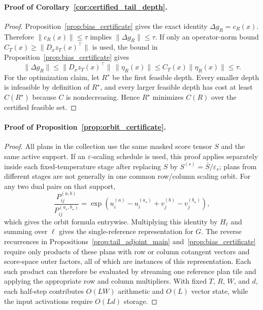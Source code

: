 \paragraph{Proof of Corollary~\ref{cor:certified_tail_depth}.}
\begin{proof}
Proposition~\ref{prop:bias_certificate} gives the exact identity $\Delta g_R=c_R(x)$. Therefore $\|c_R(x)\|\le\tau$ implies $\|\Delta g_R\|\le\tau$. If only an operator-norm bound $C_T(x)\ge\|D_xz_T(x)^\top\|$ is used, the bound in Proposition~\ref{prop:bias_certificate} gives
\[
\|\Delta g_R\|\le \|D_xz_T(x)^\top\|\,\|\eta_R(x)\|\le C_T(x)\|\eta_R(x)\|\le\tau.
\]
For the optimization claim, let $R^\star$ be the first feasible depth. Every smaller depth is infeasible by definition of $R^\star$, and every larger feasible depth has cost at least $C(R^\star)$ because $C$ is nondecreasing. Hence $R^\star$ minimizes $C(R)$ over the certified feasible set.
\end{proof}

\paragraph{Proof of Proposition~\ref{prop:orbit_certificate}.}
\begin{proof}
All plans in the collection use the same masked score tensor $S$ and the same active support. If an $\varepsilon$-scaling schedule is used, this proof applies separately inside each fixed-temperature stage after replacing $S$ by $S^{(s)}=\bar S/\varepsilon_s$; plans from different stages are not generally in one common row/column scaling orbit. For any two dual pairs on that support,
\[
\frac{P_{ij}^{(a,b)}}{P_{ij}^{(a_\star,b_\star)}}
=
\exp(u_i^{(a)}-u_i^{(a_\star)}+v_j^{(b)}-v_j^{(b_\star)}),
\]
which gives the orbit formula entrywise. Multiplying this identity by $H_\ell$ and summing over $\ell$ gives the single-reference representation for $G$. The reverse recurrences in Propositions~\ref{prop:tail_adjoint_main} and~\ref{prop:bias_certificate} require only products of these plans with row or column cotangent vectors and score-space outer factors, all of which are instances of this representation. Each such product can therefore be evaluated by streaming one reference plan tile and applying the appropriate row and column multipliers. With fixed $T$, $R$, $W$, and $d$, each half-step contributes $O(LW)$ arithmetic and $O(L)$ vector state, while the input activations require $O(Ld)$ storage.
\end{proof}

